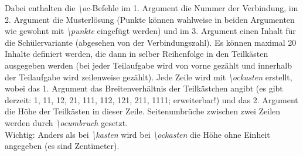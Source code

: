 \documentclass[./main.tex]{subfiles}
\begin{document}
\begin{itemize}
{    Dabei enthalten die \textit{\textbackslash oc}-Befehle im 1. Argument die Nummer der Verbindung, im 2. Argument die Musterl\"osung (Punkte k\"onnen wahlweise in beiden Argumenten wie gewohnt mit \textit{\textbackslash punkte} eingef\"ugt werden) und im 3. Argument einen Inhalt f\"ur die Sch\"ulervariante (abgesehen von der Verbindungszahl). Es k\"onnen maximal 20 Inhalte definiert werden, die dann in selber Reihenfolge in den Teilk\"asten ausgegeben werden (bei jeder Teilaufgabe wird von vorne gez\"ahlt und innerhalb der Teilaufgabe wird zeilenweise gez\"ahlt). Jede Zeile wird mit \textit{\textbackslash ockasten} erstellt, wobei das 1. Argument das Breitenverh\"altnis der Teilk\"astchen angibt (es gibt derzeit: 1, 11, 12, 21, 111, 112, 121, 211, 1111; erweiterbar!) und das 2. Argument die H\"ohe der Teilk\"asten in dieser Zeile. Seitenumbr\"uche zwischen zwei Zeilen werden durch \textit{\hypertarget{ocumbruch}{\textbackslash ocumbruch}} gesetzt. \\Wichtig: Anders als bei \textit{\textbackslash kasten} wird bei \textit{\textbackslash ockasten} die H\"ohe ohne Einheit angegeben (es sind Zentimeter). }
\end{itemize}
\end{document}
